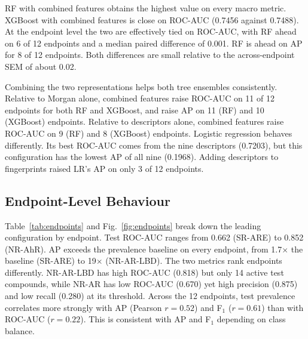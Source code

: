 \documentclass[conference]{IEEEtran}
\begin{document}
RF with combined features obtains the highest value on every macro metric. XGBoost with combined features is close on ROC-AUC (0.7456 against 0.7488). At the endpoint level the two are effectively tied on ROC-AUC, with RF ahead on 6 of 12 endpoints and a median paired difference of 0.001. RF is ahead on AP for 8 of 12 endpoints. Both differences are small relative to the across-endpoint SEM of about 0.02.

Combining the two representations helps both tree ensembles consistently. Relative to Morgan alone, combined features raise ROC-AUC on 11 of 12 endpoints for both RF and XGBoost, and raise AP on 11 (RF) and 10 (XGBoost) endpoints. Relative to descriptors alone, combined features raise ROC-AUC on 9 (RF) and 8 (XGBoost) endpoints. Logistic regression behaves differently. Its best ROC-AUC comes from the nine descriptors (0.7203), but this configuration has the lowest AP of all nine (0.1968). Adding descriptors to fingerprints raised LR's AP on only 3 of 12 endpoints.

\subsection{Endpoint-Level Behaviour}
Table~\ref{tab:endpoints} and Fig.~\ref{fig:endpoints} break down the leading configuration by endpoint. Test ROC-AUC ranges from 0.662 (SR-ARE) to 0.852 (NR-AhR). AP exceeds the prevalence baseline on every endpoint, from 1.7$\times$ the baseline (SR-ARE) to 19$\times$ (NR-AR-LBD). The two metrics rank endpoints differently. NR-AR-LBD has high ROC-AUC (0.818) but only 14 active test compounds, while NR-AR has low ROC-AUC (0.670) yet high precision (0.875) and low recall (0.280) at its threshold. Across the 12 endpoints, test prevalence correlates more strongly with AP (Pearson $r=0.52$) and F$_1$ ($r=0.61$) than with ROC-AUC ($r=0.22$). This is consistent with AP and F$_1$ depending on class balance.
\end{document}
